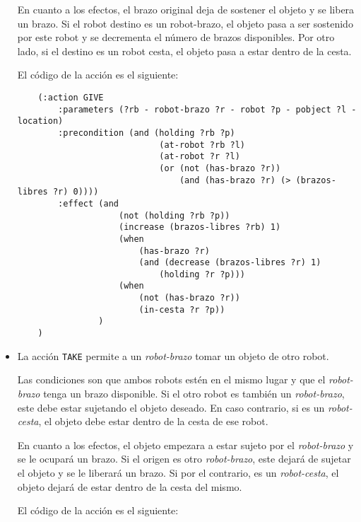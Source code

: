 \documentclass{article}
\begin{document}
\begin{itemize}
    En cuanto a los efectos, el brazo original deja de sostener el objeto y se libera un brazo. Si el robot destino es un robot-brazo, el objeto pasa a ser sostenido por este robot y se decrementa el número de brazos disponibles. Por otro lado, si el destino es un robot cesta, el objeto pasa a estar dentro de la cesta.
    
    El código de la acción es el siguiente:
    
    \begin{verbatim}
    (:action GIVE
        :parameters (?rb - robot-brazo ?r - robot ?p - pobject ?l - location)
        :precondition (and (holding ?rb ?p)
                            (at-robot ?rb ?l)
                            (at-robot ?r ?l)
                            (or (not (has-brazo ?r))
                                (and (has-brazo ?r) (> (brazos-libres ?r) 0))))
        :effect (and
                    (not (holding ?rb ?p))
                    (increase (brazos-libres ?rb) 1)
                    (when
                        (has-brazo ?r)
                        (and (decrease (brazos-libres ?r) 1)
                            (holding ?r ?p)))
                    (when
                        (not (has-brazo ?r))
                        (in-cesta ?r ?p))
                )
    )
    \end{verbatim}

    \item La acción \texttt{TAKE} permite a un \textit{robot-brazo} tomar un objeto de otro robot. 
    
    Las condiciones son que ambos robots estén en el mismo lugar y que el \textit{robot-brazo} tenga un brazo disponible. 
    Si el otro robot es también un \textit{robot-brazo}, este debe estar sujetando el objeto deseado.
    En caso contrario, si es un \textit{robot-cesta}, el objeto debe estar dentro de la cesta de ese robot. 
    
    En cuanto a los efectos, el objeto empezara a estar sujeto por el \textit{robot-brazo} y se le ocupará un brazo. 
    Si el origen es otro \textit{robot-brazo}, este dejará de sujetar el objeto y se le liberará un brazo. Si por el contrario, 
    es un \textit{robot-cesta}, el objeto dejará de estar dentro de la cesta del mismo.
    
    El código de la acción es el siguiente:
    

\end{itemize}
\end{document}
